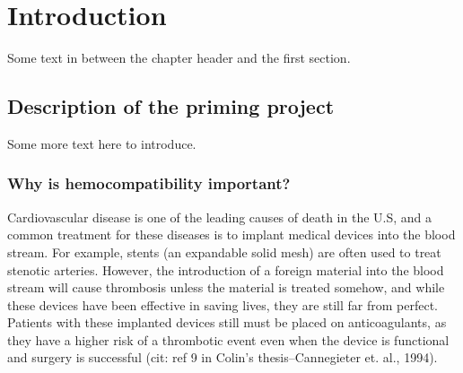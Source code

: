 
\chapter{Introduction}

Some text in between the chapter header and the first section.

\section{Description of the priming project}



Some more text here to introduce.

\subsection{Why is hemocompatibility important?}
\label{sec:why-hemoc-import}

Cardiovascular disease is one of the leading causes of death in the
U.S, and a common treatment for these diseases is to implant medical
devices into the blood stream. For example, stents (an expandable
solid mesh) are often used to treat stenotic arteries. However, the
introduction of a foreign material into the blood stream will cause
thrombosis unless the material is treated somehow, and while these
devices have been effective in saving lives, they are still far from
perfect. Patients with these implanted devices still must be placed on
anticoagulants, as they have a higher risk of a thrombotic event even
when the device is functional and surgery is successful (cit: ref 9 in
Colin's thesis--Cannegieter et. al., 1994). 

